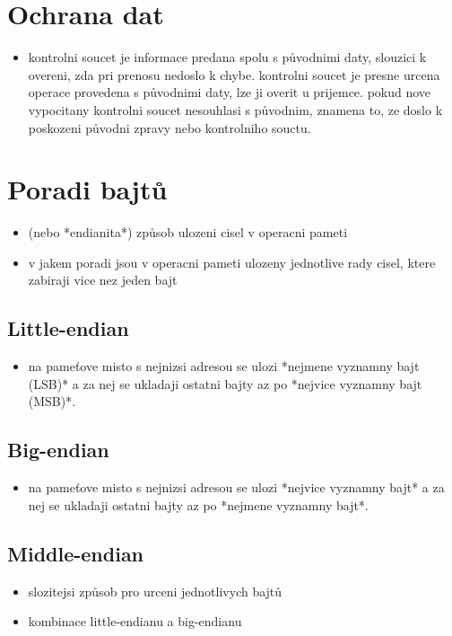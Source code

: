 \documentclass[a4paper,12pt]{article}
\begin{document}
\section{Ochrana dat}
    \begin{itemize}
        \item{kontrolni soucet je informace predana spolu s původnimi daty, slouzici k overeni, zda pri prenosu nedoslo k chybe. kontrolni soucet je presne urcena operace provedena s původnimi daty, lze ji overit u prijemce. pokud nove vypocitany kontrolni soucet nesouhlasi s původnim, znamena to, ze doslo k poskozeni původni zpravy nebo kontrolniho souctu.}
    \end{itemize}
    
\section{Poradi bajtů}
    \begin{itemize}
        \item{(nebo *endianita*) způsob ulozeni cisel v operacni pameti}
        \item{v jakem poradi jsou v operacni pameti ulozeny jednotlive rady cisel, ktere zabiraji vice nez jeden bajt}
    \end{itemize}
    \subsection{Little-endian}
        \begin{itemize}
            \item{na pameťove misto s nejnizsi adresou se ulozi *nejmene vyznamny bajt (LSB)* a za nej se ukladaji ostatni bajty az po *nejvice vyznamny bajt (MSB)*.}
        \end{itemize}
    \subsection{Big-endian}
        \begin{itemize}
            \item{na pameťove misto s nejnizsi adresou se ulozi *nejvice vyznamny bajt* a za nej se ukladaji ostatni bajty az po *nejmene vyznamny bajt*.}
        \end{itemize}
    \subsection{Middle-endian}
        \begin{itemize}
            \item{slozitejsi způsob pro urceni jednotlivych bajtů}
            \item{kombinace little-endianu a big-endianu}
        \end{itemize}
\end{document}
